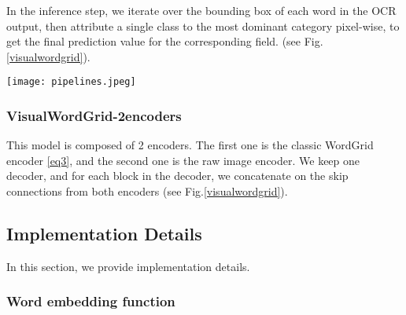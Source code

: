 \documentclass[runningheads]{llncs}
\begin{document}
In the inference step, we iterate over the bounding box of each word in the OCR output, then attribute a single class to the most dominant category pixel-wise, to get the final prediction value for the corresponding field. (see Fig.\ref{visualwordgrid}).

\begin{comment}
\begin{figure*}
  \texttt{[image: visualWordgrid.jpeg]}
  \caption{VisualWordGrid-pad pipeline.}
  \label{visualwordgrid}
\end{figure*}
\end{comment}
\begin{figure*}
  \texttt{[image: pipelines.jpeg]}
  \caption{VisualWordGrid pipelines.}
  \label{visualwordgrid}
\end{figure*}

\subsubsection{VisualWordGrid-2encoders}\hfill

This model is composed of 2 encoders. The first one is the classic WordGrid encoder \eqref{eq3}, and the second one is the raw image encoder. We keep one decoder, and for each block in the decoder, we concatenate on the skip connections from both encoders (see Fig.\ref{visualwordgrid}).

\begin{comment}
\begin{figure*}
 \center
  \texttt{[image: double\_encoder.jpeg]}
  \caption{VisualWordGrid-2encoders pipeline.}
  \label{AAA}
\end{figure*}
\end{comment}

\subsection{Implementation Details}

In this section, we provide implementation details.

\subsubsection{Word embedding function}\hfill
\end{document}
